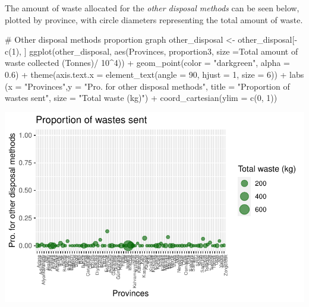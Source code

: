 \documentclass[
  11pt,
  a4paper,
  DIV=11,
  numbers=noendperiod]{scrartcl}
\newenvironment{Shaded}{\begin{snugshade}}{\end{snugshade}}
\newcommand{\AttributeTok}[1]{\textcolor[rgb]{0.40,0.45,0.13}{#1}}
\newcommand{\CommentTok}[1]{\textcolor[rgb]{0.37,0.37,0.37}{#1}}
\newcommand{\DecValTok}[1]{\textcolor[rgb]{0.68,0.00,0.00}{#1}}
\newcommand{\FloatTok}[1]{\textcolor[rgb]{0.68,0.00,0.00}{#1}}
\newcommand{\FunctionTok}[1]{\textcolor[rgb]{0.28,0.35,0.67}{#1}}
\newcommand{\NormalTok}[1]{\textcolor[rgb]{0.00,0.23,0.31}{#1}}
\newcommand{\OtherTok}[1]{\textcolor[rgb]{0.00,0.23,0.31}{#1}}
\newcommand{\SpecialCharTok}[1]{\textcolor[rgb]{0.37,0.37,0.37}{#1}}
\newcommand{\StringTok}[1]{\textcolor[rgb]{0.13,0.47,0.30}{#1}}
\begin{document}
The amount of waste allocated for the \emph{other disposal methods} can
be seen below, plotted by province, with circle diameters representing
the total amount of waste.

\begin{Shaded}
\begin{Highlighting}[]
\CommentTok{\# Other disposal methods proportion graph}
\NormalTok{other\_disposal }\OtherTok{\textless{}{-}}\NormalTok{ other\_disposal[}\SpecialCharTok{{-}}\FunctionTok{c}\NormalTok{(}\DecValTok{1}\NormalTok{), ]}
\FunctionTok{ggplot}\NormalTok{(other\_disposal, }\FunctionTok{aes}\NormalTok{(Provinces, proportion3, }\AttributeTok{size =}\StringTok{\textasciigrave{}}\AttributeTok{Total amount of waste collected  (Tonnes)}\StringTok{\textasciigrave{}}\SpecialCharTok{/} \DecValTok{10}\SpecialCharTok{\^{}}\DecValTok{4}\NormalTok{)) }\SpecialCharTok{+}
  \FunctionTok{geom\_point}\NormalTok{(}\AttributeTok{color =} \StringTok{"darkgreen"}\NormalTok{, }\AttributeTok{alpha =} \FloatTok{0.6}\NormalTok{) }\SpecialCharTok{+} \FunctionTok{theme}\NormalTok{(}\AttributeTok{axis.text.x =} \FunctionTok{element\_text}\NormalTok{(}\AttributeTok{angle =} \DecValTok{90}\NormalTok{, }\AttributeTok{hjust =} \DecValTok{1}\NormalTok{, }\AttributeTok{size =} \DecValTok{6}\NormalTok{)) }\SpecialCharTok{+}
  \FunctionTok{labs}\NormalTok{ (}\AttributeTok{x =} \StringTok{"Provinces"}\NormalTok{,}\AttributeTok{y =} \StringTok{"Pro. for other disposal methods"}\NormalTok{, }\AttributeTok{title =} \StringTok{"Proportion of wastes sent"}\NormalTok{, }\AttributeTok{size =} \StringTok{"Total waste (kg)"}\NormalTok{) }\SpecialCharTok{+} \FunctionTok{coord\_cartesian}\NormalTok{(}\AttributeTok{ylim =} \FunctionTok{c}\NormalTok{(}\DecValTok{0}\NormalTok{, }\DecValTok{1}\NormalTok{))}
\end{Highlighting}
\end{Shaded}

\includegraphics{project_files/figure-pdf/unnamed-chunk-19-1.pdf}
\end{document}
